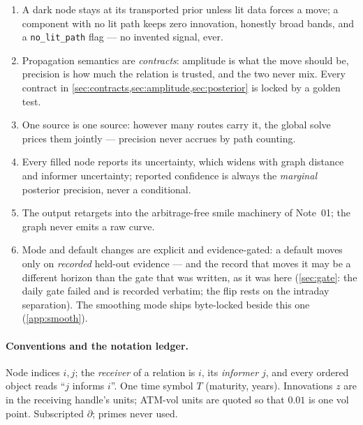\documentclass[11pt]{article}
\begin{document}
\begin{invariant}
\begin{enumerate}[leftmargin=1.6em]
\item A dark node stays at its transported prior unless lit data forces
a move; a component with no lit path keeps zero innovation, honestly
broad bands, and a \texttt{no\_lit\_path} flag --- no invented signal,
ever.
\item Propagation semantics are \emph{contracts}: amplitude is what the
move should be, precision is how much the relation is trusted, and the
two never mix.  Every contract in
\cref{sec:contracts,sec:amplitude,sec:posterior} is locked by a golden
test.
\item One source is one source: however many routes carry it, the
global solve prices them jointly --- precision never accrues by path
counting.
\item Every filled node reports its uncertainty, which widens with
graph distance and informer uncertainty; reported confidence is always
the \emph{marginal} posterior precision, never a conditional.
\item The output retargets into the arbitrage-free smile machinery of
Note~01; the graph never emits a raw curve.
\item Mode and default changes are explicit and evidence-gated: a
default moves only on \emph{recorded} held-out evidence --- and the
record that moves it may be a different horizon than the gate that was
written, as it was here (\cref{sec:gate}: the daily gate failed and is
recorded verbatim; the flip rests on the intraday separation).  The
smoothing mode ships byte-locked beside this one (\cref{app:smooth}).
\end{enumerate}
\end{invariant}

\paragraph{Conventions and the notation ledger.}
Node indices $i,j$; the \emph{receiver} of a relation is $i$, its
\emph{informer} $j$, and every ordered object reads ``$j$ informs
$i$''.  One time symbol $T$ (maturity, years).  Innovations $z$ are in
the receiving handle's units; ATM-vol units are quoted so that $0.01$
is one vol point.  Subscripted $\partial$; primes never used.
\end{document}
